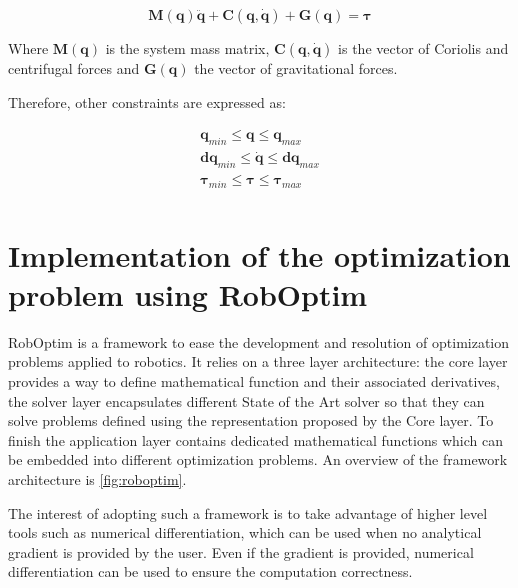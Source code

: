 \documentclass[letterpaper, 10 pt, conference]{ieeeconf}  %
\begin{document}
\begin{equation}
  \mathbf{M}(\mathbf{q}) \ddot{\mathbf{q}} + \mathbf{C}(\mathbf{q},
  \dot{\mathbf{q}}) + \mathbf{G}(\mathbf{q}) = \mathbf{\tau}
\end{equation}

Where $\mathbf{M}(\mathbf{q})$ is the system mass matrix,
$\mathbf{C}(\mathbf{q}, \dot{\mathbf{q}})$ is the vector of Coriolis
and centrifugal forces and $\mathbf{G}(\mathbf{q})$ the vector of
gravitational forces.

Therefore, other constraints are expressed as:

\begin{equation}
  \begin{array}{ccc}
    \mathbf{q}_{min} \leq \mathbf{q} \leq \mathbf{q}_{max} \\
    \mathbf{dq}_{min} \leq \dot{\mathbf{q}} \leq \mathbf{dq}_{max} \\
    \mathbf{\tau}_{min} \leq \mathbf{\tau} \leq \mathbf{\tau}_{max} \\
    \end{array}
\end{equation}



\section{Implementation of the optimization problem using RobOptim}
\label{sec:implementation}


RobOptim is a framework to ease the development and resolution of
optimization problems applied to robotics. It relies on a three layer
architecture: the core layer provides a way to define mathematical
function and their associated derivatives, the solver layer encapsulates
different State of the Art solver so that they can solve problems
defined using the representation proposed by the Core layer. To finish
the application layer contains dedicated mathematical functions which
can be embedded into different optimization problems. An overview of
the framework architecture is \autoref{fig:roboptim}.


The interest of adopting such a framework is to take advantage of
higher level tools such as numerical differentiation, which can be
used when no analytical gradient is provided by the user. Even if the
gradient is provided, numerical differentiation can be used to ensure
the computation correctness.
\end{document}
